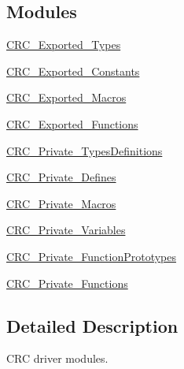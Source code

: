 \subsection*{Modules}
\begin{DoxyCompactItemize}
\item 
\hyperlink{group___c_r_c___exported___types}{C\+R\+C\+\_\+\+Exported\+\_\+\+Types}
\item 
\hyperlink{group___c_r_c___exported___constants}{C\+R\+C\+\_\+\+Exported\+\_\+\+Constants}
\item 
\hyperlink{group___c_r_c___exported___macros}{C\+R\+C\+\_\+\+Exported\+\_\+\+Macros}
\item 
\hyperlink{group___c_r_c___exported___functions}{C\+R\+C\+\_\+\+Exported\+\_\+\+Functions}
\item 
\hyperlink{group___c_r_c___private___types_definitions}{C\+R\+C\+\_\+\+Private\+\_\+\+Types\+Definitions}
\item 
\hyperlink{group___c_r_c___private___defines}{C\+R\+C\+\_\+\+Private\+\_\+\+Defines}
\item 
\hyperlink{group___c_r_c___private___macros}{C\+R\+C\+\_\+\+Private\+\_\+\+Macros}
\item 
\hyperlink{group___c_r_c___private___variables}{C\+R\+C\+\_\+\+Private\+\_\+\+Variables}
\item 
\hyperlink{group___c_r_c___private___function_prototypes}{C\+R\+C\+\_\+\+Private\+\_\+\+Function\+Prototypes}
\item 
\hyperlink{group___c_r_c___private___functions}{C\+R\+C\+\_\+\+Private\+\_\+\+Functions}
\end{DoxyCompactItemize}


\subsection{Detailed Description}
C\+RC driver modules. 


